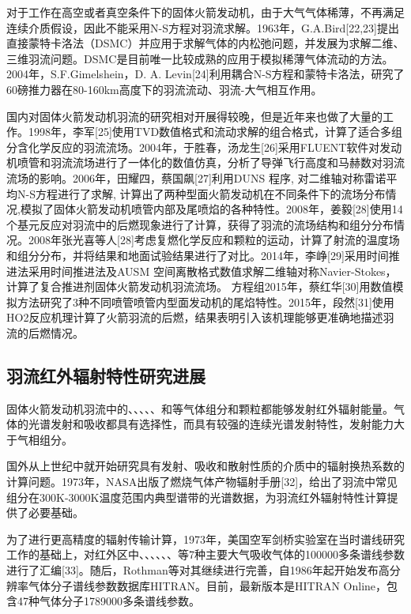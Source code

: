 对于工作在高空或者真空条件下的固体火箭发动机，由于大气气体稀薄，不再满足连续介质假设，因此不能采用N-S方程对羽流求解。1963年，G.A.Bird[22,23]提出直接蒙特卡洛法（DSMC）并应用于求解气体的内松弛问题，并发展为求解二维、三维羽流问题。DSMC是目前唯一比较成熟的应用于模拟稀薄气体流动的方法。2004年，S.F.Gimelshein，D. A. Levin[24]利用耦合N-S方程和蒙特卡洛法，研究了60磅推力器在80-160km高度下的羽流流动、羽流-大气相互作用。

国内对固体火箭发动机羽流的研究相对开展得较晚，但是近年来也做了大量的工作。1998年，李军[25]使用TVD数值格式和流动求解的组合格式，计算了适合多组分含化学反应的羽流流场。2004年，于胜春，汤龙生[26]采用FLUENT软件对发动机喷管和羽流流场进行了一体化的数值仿真，分析了导弹飞行高度和马赫数对羽流流场的影响。2006年，田耀四，蔡国飙[27]利用DUNS 程序, 对二维轴对称雷诺平均N-S方程进行了求解, 计算出了两种型面火箭发动机在不同条件下的流场分布情况,模拟了固体火箭发动机喷管内部及尾喷焰的各种特性。2008年，姜毅[28]使用14个基元反应对羽流中的后燃现象进行了计算，获得了羽流的流场结构和组分分布情况。2008年张光喜等人[28]考虑复燃化学反应和颗粒的运动，计算了射流的温度场和组分分布，并将结果和地面试验结果进行了对比。2014年，李峥[29]采用时间推进法采用时间推进法及AUSM 空间离散格式数值求解二维轴对称Navier-Stokes，计算了复合推进剂固体火箭发动机羽流流场。 方程组2015年，蔡红华[30]用数值模拟方法研究了3种不同喷管喷管内型面发动机的尾焰特性。2015年，段然[31]使用HO2反应机理计算了火箭羽流的后燃，结果表明引入该机理能够更准确地描述羽流的后燃情况。

\subsection{羽流红外辐射特性研究进展}
固体火箭发动机羽流中的、、、、、和等气体组分和颗粒都能够发射红外辐射能量。气体的光谱发射和吸收都具有选择性，而具有较强的连续光谱发射特性，发射能力大于气相组分。

国外从上世纪中就开始研究具有发射、吸收和散射性质的介质中的辐射换热系数的计算问题。1973年，NASA出版了燃烧气体产物辐射手册[32]，给出了羽流中常见组分在300K-3000K温度范围内典型谱带的光谱数据，为羽流红外辐射特性计算提供了必要基础。

为了进行更高精度的辐射传输计算，1973年，美国空军剑桥实验室在当时谱线研究工作的基础上，对红外区中、、、、、、等7种主要大气吸收气体的100000多条谱线参数进行了汇编[33]。随后，Rothman等对其继续进行完善，自1986年起开始发布高分辨率气体分子谱线参数数据库HITRAN。目前，最新版本是HITRAN Online，包含47种气体分子1789000多条谱线参数。

